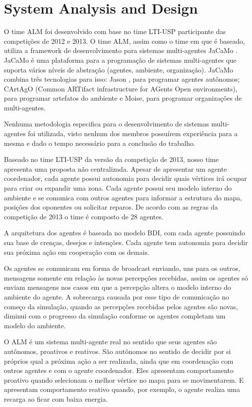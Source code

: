 \documentclass{llncs}
\begin{document}
\section{System Analysis and Design }

O time ALM foi desenvolvido com base no time LTI-USP participante das competições de 2012 e 2013. O time ALM, assim como o time em que é baseado, utiliza a framework de desenvolvimento para sistemas multi-agentes JaCaMo \cite{jacamo-scp78}. JaCaMo é uma plataforma para a programação de sistemas multi-agentes que suporta vários níveis de abstração (agentes, ambiente, organização). JaCaMo combina três tecnologias para isso: Jason , para programar agentes autônomos; CArtAgO (Common ARTifact infrastructure for AGents Open environments), para programar artefatos do ambiente e Moise, para programar organizações de multi-agentes.

Nenhuma metodologia especifica para o desenvolvimento de sistemas multi-agentes foi utilizada, visto nenhum dos membros possuírem experiência para a mesma e dado o tempo necessário para a conclusão do trabalho.

Baseado no time LTI-USP da versão da competição de 2013, nosso time apresenta uma proposta não centralizada. Apesar de apresentar um agente coordenador, cada agente possui autonomia para decidir quais vértices irá ocupar para criar ou expandir uma zona. Cada agente possui seu modelo interno do ambiente e se comunica com outros agentes para informar a estrutura do mapa, posições dos oponentes ou solicitar reparos. De acordo com as regras da competição de 2013 o time é composto de 28 agentes.

A arquitetura dos agentes é baseada no modelo BDI, com cada agente possuindo sua base de crenças, desejos e intenções. Cada agente tem autonomia para decidir sua próxima ação em cooperação com os demais.

Os agentes se comunicam em forma de broadcast enviando, uns para os outros, mensagens somente em relação às novas percepções recebidas, assim os agentes só enviam mensagens nos casos em que a percepção altera o modelo interno do ambiente do agente. A sobrecarga causada por esse tipo de comunicação no começo da simulação, quando as percepções recebidas pelos agentes são novas, diminui com o progresso da simulação conforme os agentes completam um modelo do ambiente.

O ALM é um sistema multi-agente real no sentido que seus agentes são autônomos, proativos e reativos. São autônomos no sentido de decidir por si próprios qual a próxima ação a ser realizada, ainda que em coordenação com outros agentes e com o agente coordenador. Eles apresentam comportamento proativo quando selecionam o melhor vértice no mapa para se movimentarem. E apresentam comportamento reativo quando, por exemplo, o agente realiza uma recarga ao ficar com baixa energia.
\end{document}
